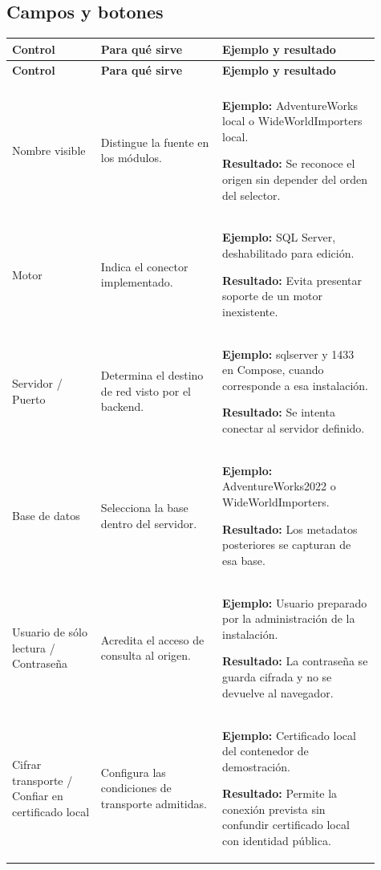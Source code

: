 \subsection{Campos y botones}
\begingroup
\fontsize{10}{12.5}\selectfont
\setlength{\tabcolsep}{5pt}
\renewcommand{\arraystretch}{1.15}
\begin{longtable}{@{}>{\RaggedRight\arraybackslash}p{0.22\linewidth}>{\RaggedRight\arraybackslash}p{0.3\linewidth}>{\RaggedRight\arraybackslash}p{0.39\linewidth}@{}}
\toprule
\textbf{Control} & \textbf{Para qué sirve} & \textbf{Ejemplo y resultado} \\
\midrule
\endfirsthead
\toprule
\textbf{Control} & \textbf{Para qué sirve} & \textbf{Ejemplo y resultado} \\
\midrule
\endhead
\midrule
\multicolumn{3}{r}{\footnotesize Continúa en la página siguiente}\\
\endfoot
\bottomrule
\endlastfoot
Nombre visible & Distingue la fuente en los módulos. & \textbf{Ejemplo:} AdventureWorks local o WideWorldImporters local.\par\smallskip\textbf{Resultado:} Se reconoce el origen sin depender del orden del selector. \\
\addlinespace[3pt]
Motor & Indica el conector implementado. & \textbf{Ejemplo:} SQL Server, deshabilitado para edición.\par\smallskip\textbf{Resultado:} Evita presentar soporte de un motor inexistente. \\
\addlinespace[3pt]
Servidor / Puerto & Determina el destino de red visto por el backend. & \textbf{Ejemplo:} sqlserver y 1433 en Compose, cuando corresponde a esa instalación.\par\smallskip\textbf{Resultado:} Se intenta conectar al servidor definido. \\
\addlinespace[3pt]
Base de datos & Selecciona la base dentro del servidor. & \textbf{Ejemplo:} AdventureWorks2022 o WideWorldImporters.\par\smallskip\textbf{Resultado:} Los metadatos posteriores se capturan de esa base. \\
\addlinespace[3pt]
Usuario de sólo lectura / Contraseña & Acredita el acceso de consulta al origen. & \textbf{Ejemplo:} Usuario preparado por la administración de la instalación.\par\smallskip\textbf{Resultado:} La contraseña se guarda cifrada y no se devuelve al navegador. \\
\addlinespace[3pt]
Cifrar transporte / Confiar en certificado local & Configura las condiciones de transporte admitidas. & \textbf{Ejemplo:} Certificado local del contenedor de demostración.\par\smallskip\textbf{Resultado:} Permite la conexión prevista sin confundir certificado local con identidad pública. \\

\end{longtable}
